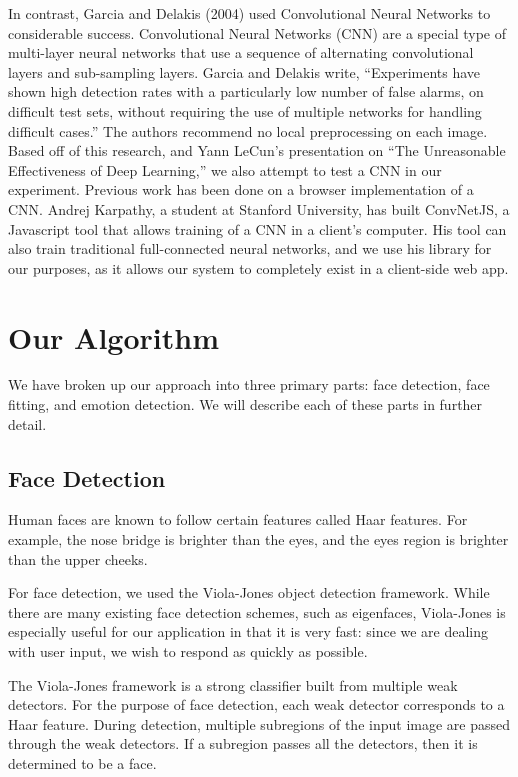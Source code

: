 \documentclass[10pt,twocolumn,letterpaper]{article}
\begin{document}
In contrast, Garcia and Delakis (2004) used Convolutional Neural Networks to considerable success. Convolutional Neural Networks (CNN) are a special type of multi-layer neural networks that use a sequence of alternating convolutional layers and sub-sampling layers. Garcia and Delakis write, ``Experiments have shown high detection rates with a particularly low number of false alarms, on difficult test sets, without requiring the use of multiple networks for handling difficult cases.'' The authors recommend no local preprocessing on each image. Based off of this research, and Yann LeCun's presentation on ``The Unreasonable Effectiveness of Deep Learning,'' we also attempt to test a CNN in our experiment. 
Previous work has been done on a browser implementation of a CNN. Andrej Karpathy, a student at Stanford University, has built ConvNetJS, a Javascript tool that allows training of a CNN in a client's computer. His tool can also train traditional full-connected neural networks, and we use his library for our purposes, as it allows our system to completely exist in a client-side web app.


\section{Our Algorithm}

We have broken up our approach into three primary parts: face detection, face fitting, and emotion detection. We will describe each of these parts in further detail.

\subsection{Face Detection}

Human faces are known to follow certain features called Haar features. For example, the nose bridge is brighter than the eyes, and the eyes region is brighter than the upper cheeks.

For face detection, we used the Viola-Jones object detection framework. While there are many existing face detection schemes, such as eigenfaces, Viola-Jones is especially useful for our application in that it is very fast: since we are dealing with user input, we wish to respond as quickly as possible.

The Viola-Jones framework is a strong classifier built from multiple weak detectors. For the purpose of face detection, each weak detector corresponds to a Haar feature. During detection, multiple subregions of the input image are passed through the weak detectors. If a subregion passes all the detectors, then it is determined to be a face.
\end{document}

